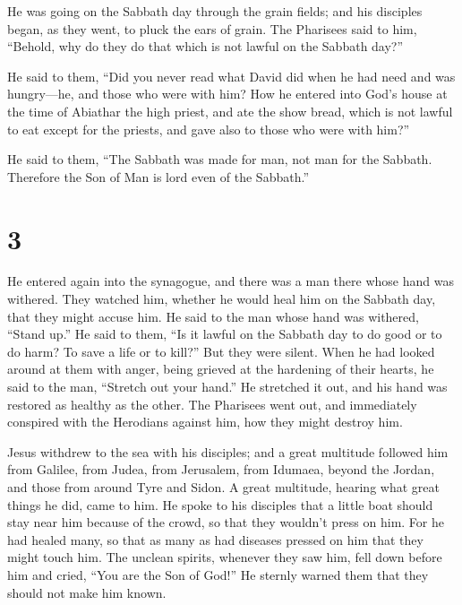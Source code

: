  He was going on the Sabbath day through the grain
fields; and his disciples began, as they went, to pluck the ears of
grain.  The Pharisees said to him, ``Behold, why do they
do that which is not lawful on the Sabbath day?''

 He said to them, ``Did you never read what David did
when he had need and was hungry---he, and those who were with him?
 How he entered into God's house at the time of Abiathar
the high priest, and ate the show bread, which is not lawful to eat
except for the priests, and gave also to those who were with him?''

 He said to them, ``The Sabbath was made for man, not man
for the Sabbath.  Therefore the Son of Man is lord even
of the Sabbath.''

\hypertarget{section-2}{%
\section{3}\label{section-2}}

 He entered again into the synagogue, and there was a man
there whose hand was withered.  They watched him, whether
he would heal him on the Sabbath day, that they might accuse him.
 He said to the man whose hand was withered, ``Stand up.''
 He said to them, ``Is it lawful on the Sabbath day to do
good or to do harm? To save a life or to kill?'' But they were silent.
 When he had looked around at them with anger, being
grieved at the hardening of their hearts, he said to the man, ``Stretch
out your hand.'' He stretched it out, and his hand was restored as
healthy as the other.  The Pharisees went out, and
immediately conspired with the Herodians against him, how they might
destroy him.

 Jesus withdrew to the sea with his disciples; and a great
multitude followed him from Galilee, from Judea,  from
Jerusalem, from Idumaea, beyond the Jordan, and those from around Tyre
and Sidon. A great multitude, hearing what great things he did, came to
him.  He spoke to his disciples that a little boat should
stay near him because of the crowd, so that they wouldn't press on him.
 For he had healed many, so that as many as had diseases
pressed on him that they might touch him.  The unclean
spirits, whenever they saw him, fell down before him and cried, ``You
are the Son of God!''  He sternly warned them that they
should not make him known.

